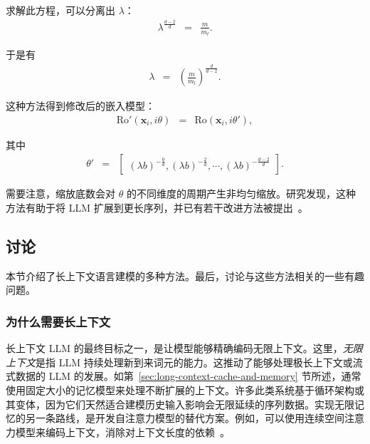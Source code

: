 求解此方程，可以分离出 $\lambda$：
\begin{eqnarray}
\lambda^{\frac{d-2}{d}} & = & \frac{m}{m_l}.
\end{eqnarray}

于是有
\begin{eqnarray}
\lambda & = & \left( \frac{m}{m_l} \right)^{\frac{d}{d-2}}.
\end{eqnarray}

这种方法得到修改后的嵌入模型：
\begin{eqnarray}
\mathrm{Ro}'(\mathbf{x}_i,i\theta) & = & \mathrm{Ro}(\mathbf{x}_i,i\theta'),
\end{eqnarray}

\noindent 其中
\begin{eqnarray}
\theta' & = & \begin{bmatrix} (\lambda b)^{-\frac{0}{d}}, (\lambda b)^{-\frac{2}{d}}, \cdots, (\lambda b)^{-\frac{d-2}{d}}\end{bmatrix}.
\end{eqnarray}

需要注意，缩放底数会对 $\theta$ 的不同维度的周期产生非均匀缩放。研究发现，这种方法有助于将 LLM 扩展到更长序列，并已有若干改进方法被提出~\cite{peng-etal:2024yarn,ding-etal:2024longrope}。

\subsection{讨论}
\label{sec:long-context-llm-remarks}

\noindent 本节介绍了长上下文语言建模的多种方法。最后，讨论与这些方法相关的一些有趣问题。

\subsubsection{为什么需要长上下文}

\noindent 长上下文 LLM 的最终目标之一，是让模型能够精确编码无限上下文。这里，\textit{无限上下文}是指 LLM 持续处理新到来词元的能力。这推动了能够处理极长上下文或流式数据的 LLM 的发展。如第~\ref{sec:long-context-cache-and-memory} 节所述，通常使用固定大小的记忆模型来处理不断扩展的上下文。许多此类系统基于循环架构或其变体，因为它们天然适合建模历史输入影响会无限延续的序列数据。实现无限记忆的另一条路线，是开发自注意力模型的替代方案。例如，可以使用连续空间注意力模型来编码上下文，消除对上下文长度的依赖~\cite{martins-etal:2022former}。

